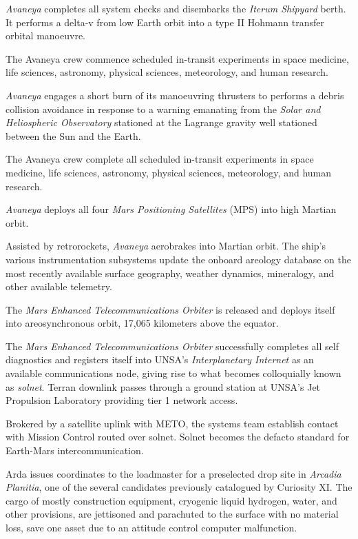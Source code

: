 {\it Avaneya} completes all system checks and disembarks the {\it Iterum Shipyard} berth. It performs a delta-v from low Earth orbit into a type II Hohmann transfer orbital manoeuvre.
\StopTimelineDate

The Avaneya crew commence scheduled in-transit experiments in space medicine, life sciences, astronomy, physical sciences, meteorology, and human research.
\StopTimelineDate

{\it Avaneya} engages a short burn of its manoeuvring thrusters to performs a debris collision avoidance in response to a warning emanating from the {\it Solar and Heliospheric Observatory} stationed at the Lagrange  gravity well stationed between the Sun and the Earth.
\StopTimelineDate

The Avaneya crew complete all scheduled in-transit experiments in space medicine, life sciences, astronomy, physical sciences, meteorology, and human research.
\StopTimelineDate

{\it Avaneya} deploys all four {\it Mars Positioning Satellites} (MPS) into high Martian orbit.
\StopTimelineDate

Assisted by retrorockets, {\it Avaneya} aerobrakes into Martian orbit. The ship's various instrumentation subsystems update the onboard areology database on the most recently available surface geography, weather dynamics, mineralogy, and other available telemetry.

The {\it Mars Enhanced Telecommunications Orbiter} is released and deploys itself into areosynchronous orbit, 17,065 kilometers above the equator.

The {\it Mars Enhanced Telecommunications Orbiter} successfully completes all self diagnostics and registers itself into UNSA's {\it Interplanetary Internet} as an available communications node, giving rise to what becomes colloquially known as {\it solnet}. Terran downlink passes through a ground station at UNSA's Jet Propulsion Laboratory providing tier 1 network access.

Brokered by a satellite uplink with METO, the systems team establish contact with Mission Control routed over solnet. Solnet becomes the defacto standard for Earth-Mars intercommunication.
\StopTimelineDate

Arda issues coordinates to the loadmaster for a preselected drop site in {\it Arcadia Planitia}, one of the several candidates previously catalogued by Curiosity XI. The cargo of mostly construction equipment, cryogenic liquid hydrogen, water, and other provisions, are jettisoned and parachuted to the surface with no material loss, save one asset due to an attitude control computer malfunction.
\StopTimelineDate


